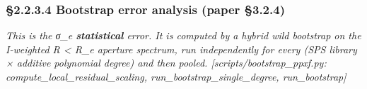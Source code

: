 \documentclass[
]{article}
\newcommand{\BreakablePath}[1]{{\ttfamily\sloppy #1}}
\begin{document}
\hypertarget{bootstrap-error-analysis-paper-3.2.4}{%
\subsubsection{§2.2.3.4 Bootstrap error analysis (paper
§3.2.4)}\label{bootstrap-error-analysis-paper-3.2.4}}

\emph{This is the σ\_e \textbf{statistical} error. It is computed by a
hybrid wild bootstrap on the I-weighted R \textless{} R\_e aperture
spectrum, run independently for every (SPS library × additive polynomial
degree) and then pooled.
{[}\BreakablePath{scripts/\discretionary{}{}{}bootstrap\_\discretionary{}{}{}ppxf.\discretionary{}{}{}py}:
\BreakablePath{compute\_\discretionary{}{}{}local\_\discretionary{}{}{}residual\_\discretionary{}{}{}scaling},
\BreakablePath{run\_\discretionary{}{}{}bootstrap\_\discretionary{}{}{}single\_\discretionary{}{}{}degree},
\BreakablePath{run\_\discretionary{}{}{}bootstrap}{]}}
\end{document}
